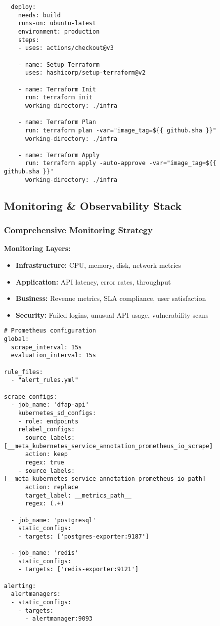 \begin{verbatim}
  deploy:
    needs: build
    runs-on: ubuntu-latest
    environment: production
    steps:
    - uses: actions/checkout@v3
    
    - name: Setup Terraform
      uses: hashicorp/setup-terraform@v2
    
    - name: Terraform Init
      run: terraform init
      working-directory: ./infra
    
    - name: Terraform Plan
      run: terraform plan -var="image_tag=${{ github.sha }}"
      working-directory: ./infra
    
    - name: Terraform Apply
      run: terraform apply -auto-approve -var="image_tag=${{ github.sha }}"
      working-directory: ./infra
\end{verbatim}

\subsection{Monitoring \& Observability Stack}

\subsubsection{Comprehensive Monitoring Strategy}

\textbf{Monitoring Layers:}
\begin{itemize}
  \item \textbf{Infrastructure:} CPU, memory, disk, network metrics
  \item \textbf{Application:} API latency, error rates, throughput
  \item \textbf{Business:} Revenue metrics, SLA compliance, user satisfaction
  \item \textbf{Security:} Failed logins, unusual API usage, vulnerability scans
\end{itemize}

\begin{verbatim}
# Prometheus configuration
global:
  scrape_interval: 15s
  evaluation_interval: 15s

rule_files:
  - "alert_rules.yml"

scrape_configs:
  - job_name: 'dfap-api'
    kubernetes_sd_configs:
    - role: endpoints
    relabel_configs:
    - source_labels: [__meta_kubernetes_service_annotation_prometheus_io_scrape]
      action: keep
      regex: true
    - source_labels: [__meta_kubernetes_service_annotation_prometheus_io_path]
      action: replace
      target_label: __metrics_path__
      regex: (.+)

  - job_name: 'postgresql'
    static_configs:
    - targets: ['postgres-exporter:9187']

  - job_name: 'redis'
    static_configs:
    - targets: ['redis-exporter:9121']

alerting:
  alertmanagers:
  - static_configs:
    - targets:
      - alertmanager:9093
\end{verbatim}


